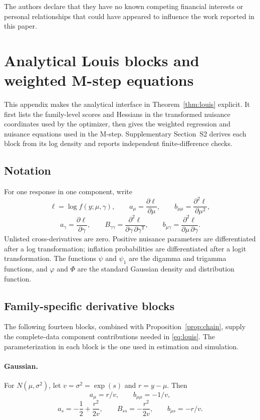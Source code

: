 \documentclass[a4paper,fleqn]{cas-sc}
\newcommand{\T}{\mathsf T}
\begin{document}
The authors declare that they have no known competing financial interests or personal relationships that could have appeared to influence the work reported in this paper.

\appendix

\section{Analytical Louis blocks and weighted M-step equations}
\label{app:analytic}

This appendix makes the analytical interface in Theorem~\ref{thm:louis} explicit. It first lists the family-level scores and Hessians in the transformed nuisance coordinates used by the optimizer, then gives the weighted regression and nuisance equations used in the M-step. Supplementary Section~S2 derives each block from its log density and reports independent finite-difference checks.

\subsection{Notation}
\label{app:notation}

For one response in one component, write
\[
 \ell=\log f(y;\mu,\gamma),\qquad
 a_\mu=\frac{\partial\ell}{\partial\mu},\qquad
 b_{\mu\mu}=\frac{\partial^2\ell}{\partial\mu^2},
\]
\[
 a_\gamma=\frac{\partial\ell}{\partial\gamma},\qquad
 B_{\gamma\gamma}=\frac{\partial^2\ell}{\partial\gamma\,\partial\gamma^\T},
 \qquad b_{\mu\gamma}=\frac{\partial^2\ell}{\partial\mu\,\partial\gamma}.
\]
Unlisted cross-derivatives are zero. Positive nuisance parameters are differentiated after a log transformation; inflation probabilities are differentiated after a logit transformation. The functions $\psi$ and $\psi_1$ are the digamma and trigamma functions, and $\varphi$ and $\Phi$ are the standard Gaussian density and distribution function.

\subsection{Family-specific derivative blocks}
\label{app:family-blocks}

The following fourteen blocks, combined with Proposition~\ref{prop:chain}, supply the complete-data component contributions needed in \eqref{eq:louis}. The parameterization in each block is the one used in estimation and simulation.

\paragraph{Gaussian.}
For $N(\mu,\sigma^2)$, let $v=\sigma^2=\exp(s)$ and $r=y-\mu$. Then
\[
 a_\mu=r/v,\qquad b_{\mu\mu}=-1/v,
\]
\[
 a_s=-\frac12+\frac{r^2}{2v},\qquad
 B_{ss}=-\frac{r^2}{2v},\qquad b_{\mu s}=-r/v.
\]
\end{document}
